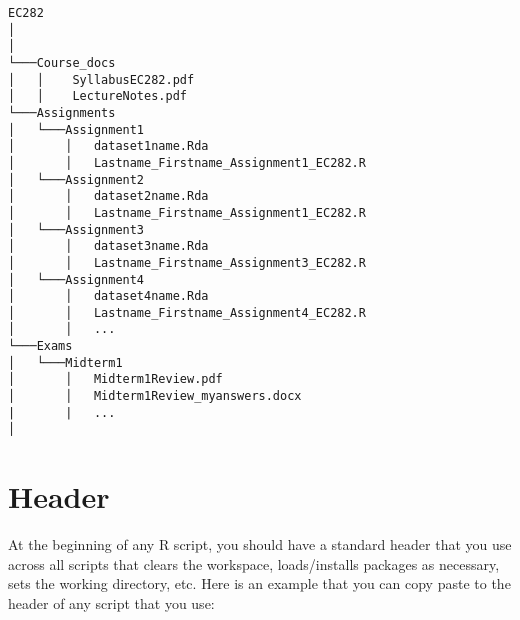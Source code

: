 \documentclass[
]{book}
\begin{document}
\begin{verbatim}
EC282
│  
│
└───Course_docs
│   │    SyllabusEC282.pdf
│   │    LectureNotes.pdf 
└───Assignments
│   └───Assignment1
│       │   dataset1name.Rda
│       │   Lastname_Firstname_Assignment1_EC282.R
│   └───Assignment2
│       │   dataset2name.Rda
│       │   Lastname_Firstname_Assignment1_EC282.R
│   └───Assignment3
│       │   dataset3name.Rda
│       │   Lastname_Firstname_Assignment3_EC282.R
│   └───Assignment4
│       │   dataset4name.Rda
│       │   Lastname_Firstname_Assignment4_EC282.R
│       │   ...
└───Exams
│   └───Midterm1
│       │   Midterm1Review.pdf
│       │   Midterm1Review_myanswers.docx
|       |   ...
│   
\end{verbatim}

\hypertarget{header}{%
\section{Header}\label{header}}

At the beginning of any R script, you should have a standard header that you use across all scripts that clears the workspace, loads/installs packages as necessary, sets the working directory, etc. Here is an example that you can copy paste to the header of any script that you use:
\end{document}
